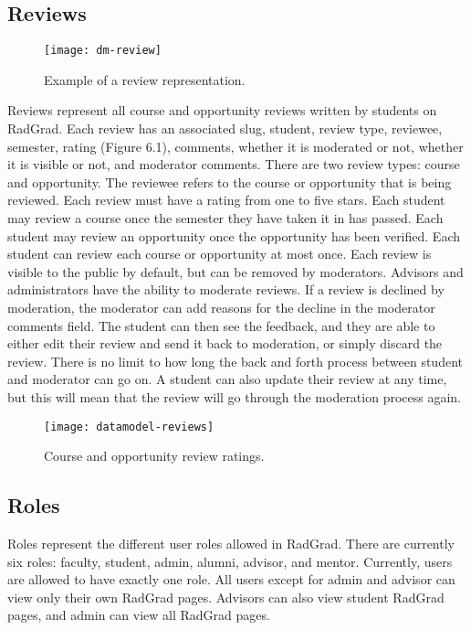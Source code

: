 \subsection{Reviews}
\begin{figure}[h]
\centering
\texttt{[image: dm-review]}
\caption{Example of a review representation.}
\end{figure}
Reviews represent all course and opportunity reviews written by students on RadGrad. Each review has an associated slug, student, review type, reviewee, semester, rating (Figure 6.1), comments, whether it is moderated or not, whether it is visible or not, and moderator comments. There are two review types: course and opportunity. The reviewee refers to the course or opportunity that is being reviewed. Each review must have a rating from one to five stars. Each student may review a course once the semester they have taken it in has passed. Each student may review an opportunity once the opportunity has been verified. Each student can review each course or opportunity at most once. Each review is visible to the public by default, but can be removed by moderators. Advisors and administrators have the ability to moderate reviews. If a review is declined by moderation, the moderator can add reasons for the decline in the moderator comments field. The student can then see the feedback, and they are able to either edit their review and send it back to moderation, or simply discard the review. There is no limit to how long the back and forth process between student and moderator can go on. A student can also update their review at any time, but this will mean that the review will go through the moderation process again.

\begin{figure}[h]
\centering
\texttt{[image: datamodel-reviews]}
\caption{Course and opportunity review ratings.}
\end{figure}

\subsection{Roles}
Roles represent the different user roles allowed in RadGrad. There are currently six roles: faculty, student, admin, alumni, advisor, and mentor. Currently, users are allowed to have exactly one role. All users except for admin and advisor can view only their own RadGrad pages. Advisors can also view student RadGrad pages, and admin can view all RadGrad pages. 


